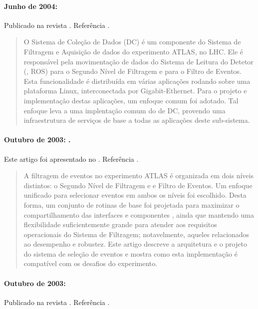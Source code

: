 \paragraph{Junho de 2004: } Publicado
na revista . Referência
\cite{aa:tns-04-04}.

\begin{quotation}
O Sistema de Coleção de Dados (DC) é um componente do Sistema de Filtragem e
Aquisição de dados do experimento ATLAS, no LHC. Ele é responsável pela
movimentação de dados do Sistema de Leitura do Detetor (,
ROS) para o Segundo Nível de Filtragem e para o Filtro de Eventos. Esta
funcionalidade é distribuída em várias aplicações rodando sobre uma plataforma
Linux, interconectada por Gigabit-Ethernet. Para o projeto e implementação
destas aplicações, um enfoque comum foi adotado. Tal enfoque leva a uma
implentação comum do  de DC, provendo uma infraestrutura de
serviços de base a todas as aplicações deste sub-sistema.
\end{quotation}

\paragraph{Outubro de 2003: .} Este artigo foi apresentado no
 . Referência \cite{aa:como-2003}.

\begin{quotation}
A filtragem de eventos no experimento ATLAS é organizada em dois níveis
distintos: o Segundo Nível de Filtragem e e Filtro de Eventos. Um enfoque
unificado para selecionar eventos em ambos os níveis foi escolhido. Desta
forma, um conjunto de rotinas de base foi projetada para maximizar o
compartilhamento das interfaces e componentes , ainda que
mantendo uma flexibilidade suficientemente grande para atender aos requisitos
operacionais do Sistema de Filtragem; notavelmente, aqueles relacionados ao
desempenho e robustez. Este artigo descreve a arquitetura e o projeto do
sistema de seleção de eventos e mostra como esta implementação é compatível
com os desafios do experimento.
\end{quotation}

\paragraph{Outubro de 2003: } Publicado na revista . Referência \cite{aa:tns-2004-2}.

